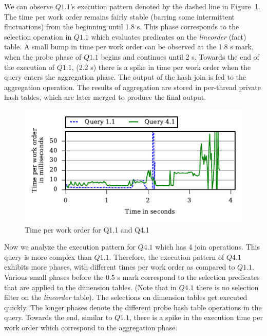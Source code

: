 We can observe $Q1.1$'s execution pattern denoted by the dashed line in Figure~\ref{fig:q1.1-q4.1-time-per-wo}. 
The time per work order remains fairly stable (barring some intermittent fluctuations) from the beginning until 1.8 s.
This phase corresponds to the selection operation in $Q1.1$ which evaluates predicates on the \textit{lineorder} (fact) table.
A small bump in time per work order can be observed at the 1.8 s mark, when the probe phase of $Q1.1$ begins and continues until 2 s.
Towards the end of the execution of $Q1.1$, (2.2 s) there is a spike in time per work order when the query enters the aggregation phase. 
The output of the hash join is fed to the aggregation operation. 
The results of aggregation are stored in per-thread private hash tables, which are later merged to produce the final output.

\begin{figure}[h]
	\centering
	\includegraphics[width=\columnwidth]{figures/q11-q41-time-per-wo.pdf}
	\vspace{-2.5em}
	\caption{Time per work order for Q1.1 and Q4.1}
	\label{fig:q1.1-q4.1-time-per-wo}
\end{figure}

Now we analyze the execution pattern for $Q4.1$ which has 4 join operations. 
This query is more complex than $Q1.1$.%
Therefore, the execution pattern of $Q4.1$ exhibits more phases, with different times per work order as compared to $Q1.1$.
Various small phases before the 0.5 s mark correspond to the selection predicates that are applied to the dimension tables. (Note that in $Q4.1$ there is no selection filter on the \textit{lineorder} table).
The selections on dimension tables get executed quickly.
The longer phases denote the different probe hash table operations in the query.
Towards the end, similar to $Q1.1$, there is a spike in the execution time per work order which correspond to the aggregation phase.

